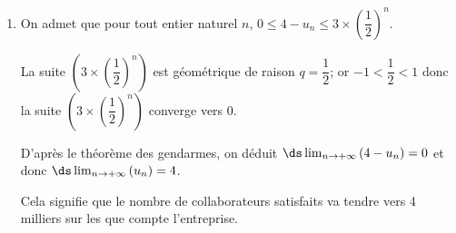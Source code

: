 \begin{enumerate}
\begin{enumerate}

On a donc démontré que pour tout $n$, on a: $0 \leqslant u_n \leqslant  u_{n+1}  \leqslant  4$.
		
		\item 
{}

La suite $(u_n)$ est croissante et majorée donc, d'après le théorème de la convergence monotone, la suite $(u_n)$ est convergente.

	\end{enumerate}
	
\item On admet que pour tout entier naturel $n$,
$0  \leqslant 4 - u_n \leqslant 3 \times \left(\dfrac{1}{2}\right)^n$.

La suite $ \left (3 \times \left(\dfrac{1}{2}\right)^n\right )$ est géométrique de raison $q=\dfrac{1}{2}$; or $-1<\dfrac{1}{2}<1$ donc la suite $ \left (3 \times \left(\dfrac{1}{2}\right)^n\right )$ converge vers 0.

D'après le théorème des gendarmes, on déduit
$\ds\lim_{n \to +\infty} \left (4 - u_n \right )=0$
et donc $\ds\lim_{n \to +\infty} \left ( u_n \right )=4$.



Cela signifie que le nombre de collaborateurs satisfaits va tendre vers 4 milliers sur les  que compte l'entreprise.

\end{enumerate}

\bigskip
